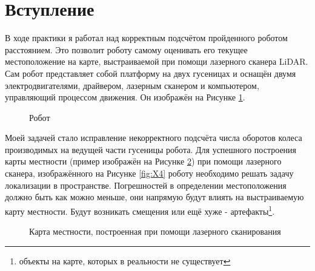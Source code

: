 \documentclass[12pt,a4paper]{scrartcl}
\begin{document}
						
		\section*{Вступление}
			В ходе практики я работал над корректным подсчётом пройденного роботом расстоянием. Это позволит роботу самому оценивать его текущее местоположение на карте, выстраиваемой при помощи лазерного сканера LiDAR. Сам робот представляет собой платформу на двух гусеницах и оснащён двумя электродвигателями, драйвером, лазерным сканером и компьютером, управляющий процессом движения. Он изображён на Рисунке \ref{fig:Robot}.
			
			\begin{figure}[h]
				\caption{Робот}
				\label{fig:Robot}
			\end{figure}
			
			Моей задачей стало исправление некорректного подсчёта числа оборотов колеса производимых на ведущей части гусеницы робота. Для успешного построения карты местности (пример изображён на Рисунке \ref{fig:Map}) при помощи лазерного сканера, изображённого на Рисунке \ref{fig:X4} роботу необходимо решать задачу локализации в пространстве. Погрешностей в определении местоположения должно быть как можно меньше, они напрямую будут влиять на выстраиваемую карту местности. Будут возникать смещения или ещё хуже - артефакты\footnote{объекты на карте, которых в реальности не существует}.
			
			\begin{figure}[h]
				\caption{Карта местности, построенная при помощи лазерного сканирования}
				\label{fig:Map}
			\end{figure}
			
\end{document}
